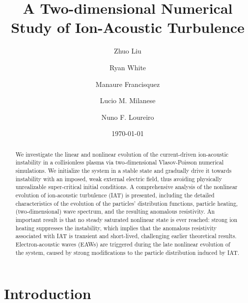 \documentclass[%
 reprint,
 amsmath,
 amssymb,
 aps,
 prx,
floatfix,
superscriptaddress
]{revtex4-2}
\begin{document}

\title{A Two-dimensional Numerical Study of Ion-Acoustic Turbulence }%


\author{Zhuo Liu}
%
\author{Ryan White}%
%
\author{Manaure Francisquez}
%
\author{Lucio M. Milanese}
%
\author{Nuno F. Loureiro}
%


\date{\today}


\begin{abstract}
We investigate the linear and nonlinear evolution of the current-driven ion-acoustic instability in a collisionless plasma via two-dimensional Vlasov-Poisson numerical simulations.
We initialize the system in a stable state and gradually drive it towards instability with an imposed, weak external electric field, thus avoiding physically unrealizable super-critical initial conditions.
A comprehensive analysis of the nonlinear evolution of ion-acoustic turbulence (IAT) is presented, including the detailed characteristics of the evolution of the particles' distribution functions, particle heating, (two-dimensional) wave spectrum, and the resulting anomalous resistivity.
An important result is that no steady saturated nonlinear state is ever reached: strong ion heating suppresses the instability, which implies that the anomalous resistivity associated with IAT is transient and short-lived, challenging earlier theoretical results.
Electron-acoustic waves (EAWs) are triggered during the late nonlinear evolution of the system,  caused by strong modifications to the particle distribution induced by IAT.
\end{abstract}

\maketitle


\section{\label{sec:introduction}Introduction}
\end{document}
